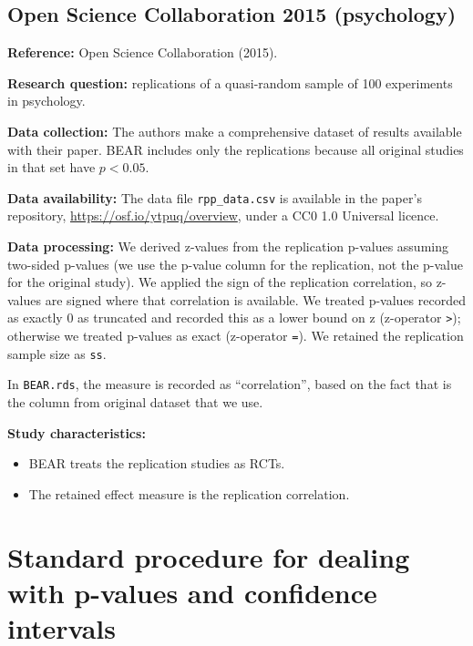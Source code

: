 \documentclass[
  11pt,
]{article}
\providecommand{\tightlist}{%
  \setlength{\itemsep}{0pt}\setlength{\parskip}{0pt}}
\begin{document}
\subsection{Open Science Collaboration 2015
(psychology)}\label{open-science-collaboration-2015-psychology}

\textbf{Reference:} Open Science Collaboration (2015).

\textbf{Research question:} replications of a quasi-random sample of 100
experiments in psychology.

\textbf{Data collection:} The authors make a comprehensive dataset of
results available with their paper. BEAR includes only the replications
because all original studies in that set have \(p < 0.05\).

\textbf{Data availability:} The data file \texttt{rpp\_data.csv} is
available in the paper's repository,
\url{https://osf.io/ytpuq/overview}, under a CC0 1.0 Universal licence.

\textbf{Data processing:} We derived z-values from the replication
p-values assuming two-sided p-values (we use the p-value column for the
replication, not the p-value for the original study). We applied the
sign of the replication correlation, so z-values are signed where that
correlation is available. We treated p-values recorded as exactly 0 as
truncated and recorded this as a lower bound on z (z-operator
\texttt{\textgreater{}}); otherwise we treated p-values as exact
(z-operator \texttt{=}). We retained the replication sample size as
\texttt{ss}.

In \texttt{BEAR.rds}, the measure is recorded as ``correlation'', based
on the fact that is the column from original dataset that we use.

\textbf{Study characteristics:}

\begin{itemize}
\tightlist
\item
  BEAR treats the replication studies as RCTs.
\item
  The retained effect measure is the replication correlation.
\end{itemize}

\newpage

\section{Standard procedure for dealing with p-values and confidence
intervals}\label{standard-procedure-for-dealing-with-p-values-and-confidence-intervals}
\end{document}

